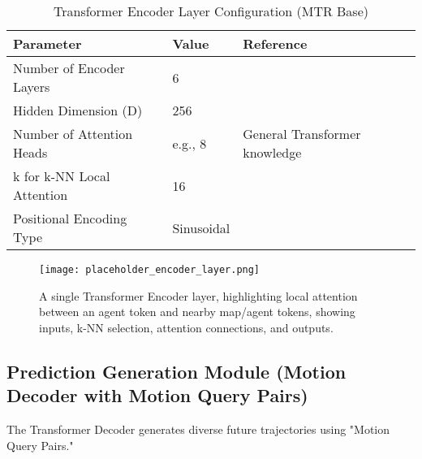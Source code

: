 \begin{table}[h!]
    \centering
    \caption{Transformer Encoder Layer Configuration (MTR Base)}
    \label{tab:encoder_config}
    \begin{tabular}{@{}lll@{}}
        \toprule
        Parameter & Value & Reference \\
        \midrule
        Number of Encoder Layers & 6 & \cite{Shi2022MTR_A} \\
        Hidden Dimension (D) & 256 & \cite{Shi2022MTR} \\
        Number of Attention Heads & e.g., 8 & General Transformer knowledge \\
        k for k-NN Local Attention & 16 & \cite{Shi2022MTR} \\
        Positional Encoding Type & Sinusoidal & \cite{Shi2022MTR} \\
        \bottomrule
    \end{tabular}
\end{table}

\begin{figure}[h!]
    \centering
    \texttt{[image: placeholder\_encoder\_layer.png]} %
    \caption{A single Transformer Encoder layer, highlighting local attention between an agent token and nearby map/agent tokens, showing inputs, k-NN selection, attention connections, and outputs.}
    \label{fig:encoder_layer}
\end{figure}

\subsection{Prediction Generation Module (Motion Decoder with Motion Query Pairs)}
\label{subsec:prediction_generation}

The Transformer Decoder generates diverse future trajectories using "Motion Query Pairs."

